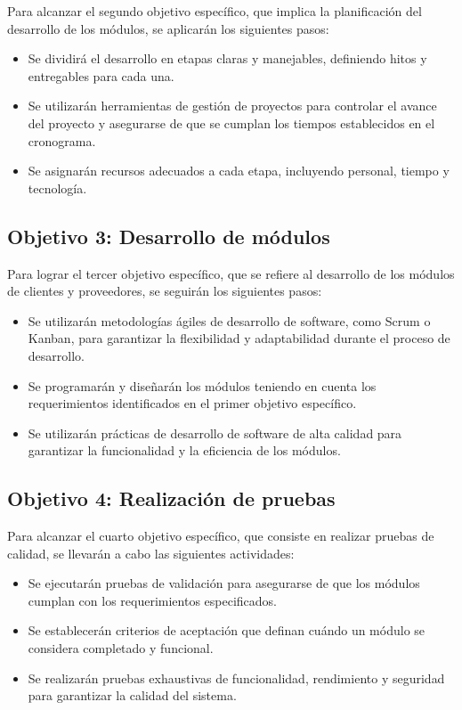 \documentclass{article}
\begin{document}
Para alcanzar el segundo objetivo específico, que implica la planificación del desarrollo de los módulos, se aplicarán los siguientes pasos:

\begin{itemize}
    \item Se dividirá el desarrollo en etapas claras y manejables, definiendo hitos y entregables para cada una.
    \item Se utilizarán herramientas de gestión de proyectos para controlar el avance del proyecto y asegurarse de que se cumplan los tiempos establecidos en el cronograma.
    \item Se asignarán recursos adecuados a cada etapa, incluyendo personal, tiempo y tecnología.
\end{itemize}

\subsection{Objetivo 3: Desarrollo de módulos}

Para lograr el tercer objetivo específico, que se refiere al desarrollo de los módulos de clientes y proveedores, se seguirán los siguientes pasos:

\begin{itemize}
    \item Se utilizarán metodologías ágiles de desarrollo de software, como Scrum o Kanban, para garantizar la flexibilidad y adaptabilidad durante el proceso de desarrollo.
    \item Se programarán y diseñarán los módulos teniendo en cuenta los requerimientos identificados en el primer objetivo específico.
    \item Se utilizarán prácticas de desarrollo de software de alta calidad para garantizar la funcionalidad y la eficiencia de los módulos.
\end{itemize}

\subsection{Objetivo 4: Realización de pruebas}

Para alcanzar el cuarto objetivo específico, que consiste en realizar pruebas de calidad, se llevarán a cabo las siguientes actividades:

\begin{itemize}
    \item Se ejecutarán pruebas de validación para asegurarse de que los módulos cumplan con los requerimientos especificados.
    \item Se establecerán criterios de aceptación que definan cuándo un módulo se considera completado y funcional.
    \item Se realizarán pruebas exhaustivas de funcionalidad, rendimiento y seguridad para garantizar la calidad del sistema.
\end{itemize}
\end{document}
